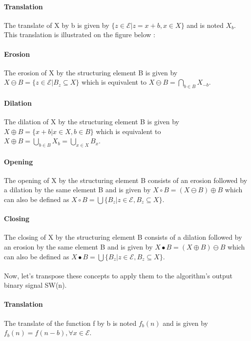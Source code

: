 \documentclass[a4paper,12pt]{article}
\begin{document}
\paragraph{Translation}
The translate of X by b is given by $\{z \in \mathcal{E}| z = x + b, x \in X \} $ and is noted $X_b$. This translation is illustrated on the figure below :

\paragraph{Erosion}
The erosion of X by the structuring element B is given by $X \ominus B = \{ z \in \mathcal{E} | B_z \subseteq X \}$ which is equivalent to $X \ominus B = \bigcap\limits_{b \in B} X_{-b}$.

\paragraph{Dilation}
The dilation of X by the structuring element B is given by $X \oplus B = \{x + b | x \in X, b \in B\}$ which is equivalent to $X \oplus B = \bigcup\limits_{b \in B} X_b = \bigcup\limits_{x \in X} B_x$.

\paragraph{Opening}
The opening of X by the structuring element B consists of an erosion followed by a dilation by the same element B and is given by $X \circ B = (X \ominus B) \oplus B$ which can also be defined as $X \circ B = \bigcup\{B_z | z \in \mathcal{E}, B_z \subseteq X \}$.

\paragraph{Closing}
The closing of X by the structuring element B consists of a dilation followed by an erosion by the same element B and is given by $X \bullet B = (X \oplus B) \ominus B$ which can also be defined as $X \bullet B = \bigcup\{B_z | z \in \mathcal{E}, B_z \subseteq X \}$.

\paragraph{}
Now, let's transpose these concepts to apply them to the algorithm's output binary signal SW(n).

\paragraph{Translation}
The translate of the function f by b is noted $f_b(n)$ and is given by $f_b(n) = f(n-b), \forall x \in \mathcal{E}$.
\end{document}
